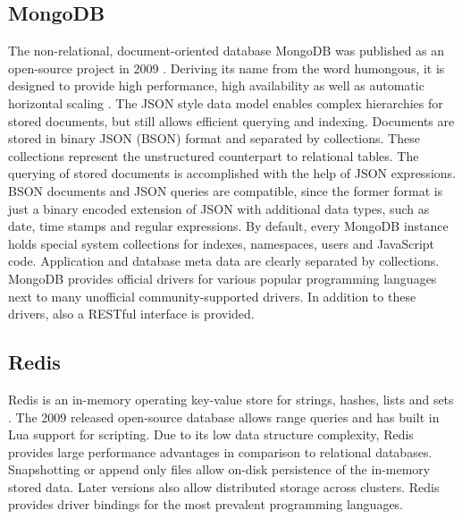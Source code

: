 \subsection{MongoDB}
The non-relational, document-oriented database MongoDB was published as an open-source project in 2009 \cite{Eliot:2010}. Deriving its name from the word humongous, it is designed to provide high performance, high availability as well as automatic horizontal scaling \cite{MongoDB_Intro:2016}. The JSON style data model enables complex hierarchies for stored documents, but still allows efficient querying and indexing. Documents are stored in binary JSON (BSON) format and separated by collections. These collections represent the unstructured counterpart to relational tables. The querying of stored documents is accomplished with the help of JSON expressions. BSON documents and JSON queries are compatible, since the former format is just a binary encoded extension of JSON with additional data types, such as date, time stamps and regular expressions. By default, every MongoDB instance holds special system collections for indexes, namespaces, users and JavaScript code. Application and database meta data are clearly separated by collections. MongoDB provides official drivers for various popular programming languages next to many unofficial community-supported drivers. In addition to these drivers, also a RESTful interface is provided.

\subsection{Redis}
Redis is an in-memory operating key-value store for strings, hashes, lists and sets \cite{Sanfilippo:2016}. The 2009 released open-source database allows range queries and has built in Lua support for scripting. Due to its low data structure complexity, Redis provides large performance advantages in comparison to relational databases. Snapshotting or append only files allow on-disk persistence of the in-memory stored data. Later versions also allow distributed storage across clusters. Redis provides driver bindings for the most prevalent programming languages.

